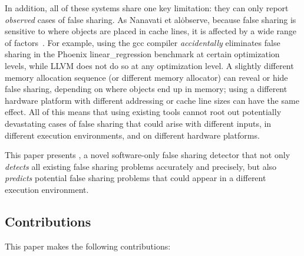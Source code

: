 In addition, all of these systems share one key limitation: they can
only report \emph{observed} cases of false sharing. As Nanavati et
al\. observe, because false sharing is sensitive to where objects are
placed in cache lines, it is affected by a wide range of
factors~\cite{OSdetection}. For example, using the gcc compiler
\emph{accidentally} eliminates false sharing in the Phoenix
linear\_regression benchmark at certain optimization levels, while
LLVM does not do so at any optimization level.  A slightly different memory
allocation sequence (or different memory allocator) can reveal or hide
false sharing, depending on where objects end up in memory; using a
different hardware platform with different addressing or cache line
sizes can have the same effect. All of this means that using existing
tools cannot root out potentially devastating cases of false sharing
that could arise with different inputs, in different execution
environments, and on different hardware platforms.




This paper presents \Predator{}, a novel software-only false sharing
detector that not only \emph{detects} all existing false sharing
problems accurately and precisely, but also \emph{predicts} potential
false sharing problems that could appear in a  different execution
environment.

\subsection*{Contributions}

This paper makes the following contributions:

